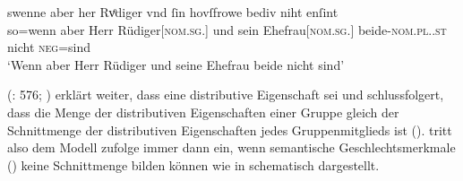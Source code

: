 \begin{exe}
\ex \label{ex:gendres2}
		\gll swenne aber her Rvͦdiger vnd ſin
			hovſfrowe bediv niht enſint \\
		so=wenn aber Herr Rüdiger[\textsc{nom.sg.\MascM}] und sein
			Ehefrau[\textsc{nom.sg.\FemF}] beide-\textsc{nom.pl.\NeutMF.st}
			nicht \textsc{neg}=sind \\
		\trans `Wenn aber Herr Rüdiger und seine Ehefrau
			beide nicht  sind'
			\parencites(Nr.~3262, Regensburg, 1299)[425,13--14]{cao4}
\end{exe}

\citeauthor{wechsler2009} (\citeyear{wechsler2009}: 576;
\cite[vgl.~auch][182]{wechslerzlatic2003}) erklärt weiter, dass 
eine distributive Eigenschaft sei und schlussfolgert, dass die Menge der
distributiven Eigenschaften einer Gruppe gleich der Schnittmenge der
distributiven Eigenschaften jedes Gruppenmitglieds ist
().
%
%
 tritt also dem Modell zufolge immer dann ein, wenn
semantische Geschlechtsmerkmale
() keine Schnittmenge bilden können wie in 
schematisch dargestellt.

